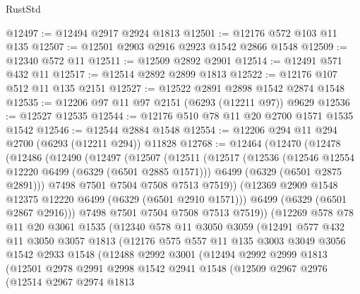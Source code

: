\begin{lexlean}{RustStd}
\begin{coremodule}
{{@12497 := @12494 @2917 @2924 @1813
@12501 := @12176 @572 @103 @11 @135
@12507 := @12501 @2903 @2916 @2923 @1542 @2866 @1548
@12509 := @12340 @572 @11
@12511 := @12509 @2892 @2901
@12514 := @12491 @571 @432 @11
@12517 := @12514 @2892 @2899 @1813
@12522 := @12176 @107 @512 @11 @135 @2151
@12527 := @12522 @2891 @2898 @1542 @2874 @1548
@12535 := @12206 @97 @11 @97 @2151 (@6293 (@12211 @97)) @9629
@12536 := @12527 @12535
@12544 := @12176 @510 @78 @11 @20 @2700 @1571 @1535 @1542
@12546 := @12544 @2884 @1548
@12554 := @12206 @294 @11 @294 @2700 (@6293 (@12211 @294)) @11828
@12768 := @12464
    (@12470
      (@12478
        (@12486
          (@12490
            (@12497
              (@12507
                (@12511
                  (@12517
                    (@12536
                      (@12546 @12554 @12220 @6499 (@6329 (@6501 @2885 @1571)))
                      @6499
                      (@6329 (@6501 @2875 @2891)))
                    @7498
                    @7501
                    @7504
                    @7508
                    @7513
                    @7519))
                (@12369 @2909 @1548 @12375 @12220 @6499 (@6329 (@6501 @2910 @1571)))
                @6499
                (@6329 (@6501 @2867 @2916)))
              @7498
              @7501
              @7504
              @7508
              @7513
              @7519))
          (@12269
            @578
            @78
            @11
            @20
            @3061
            @1535
            (@12340
              @578
              @11
              @3050
              @3059
              (@12491
                @577
                @432
                @11
                @3050
                @3057
                @1813
                (@12176
                  @575
                  @557
                  @11
                  @135
                  @3003
                  @3049
                  @3056
                  @1542
                  @2933
                  @1548
                  (@12488
                    @2992
                    @3001
                    (@12494
                      @2992
                      @2999
                      @1813
                      (@12501
                        @2978
                        @2991
                        @2998
                        @1542
                        @2941
                        @1548
                        (@12509
                          @2967
                          @2976
                          (@12514
                            @2967
                            @2974
                            @1813
}}
\end{coremodule}
\end{lexlean}
